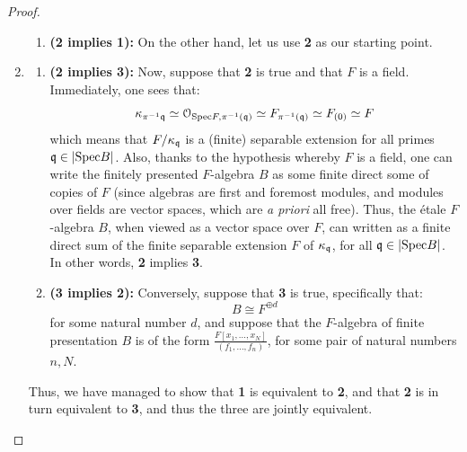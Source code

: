 \begin{proof}
\begin{enumerate}
\begin{enumerate}
                                \item \textbf{(2 implies 1):} On the other hand, let us use \textbf{2} as our starting point. 
                            \end{enumerate}
                        \item 
                            \begin{enumerate}
                                \item \textbf{(2 implies 3):} Now, suppose that \textbf{2} is true and that $F$ is a field. Immediately, one sees that:
                                    $$\kappa_{\pi^{-1}{\mathfrak{q}}} \simeq \mathcal{O}_{\mathrm{Spec} F, \pi^{-1}(\mathfrak{q})} \simeq F_{\pi^{-1}(\mathfrak{q})} \simeq F_{(0)} \simeq F$$ 
                                which means that $F/\kappa_{\mathfrak{q}}$ is a (finite) separable extension for all primes $\mathfrak{q} \in \left|\mathrm{Spec} B\right|$. Also, thanks to the hypothesis whereby $F$ is a field, one can write the finitely presented $F$-algebra $B$ as some finite direct some of copies of $F$ (since algebras are first and foremost modules, and modules over fields are vector spaces, which are \textit{a priori} all free). Thus, the \'etale $F$-algebra $B$, when viewed as a vector space over $F$, can written as a finite direct sum of the finite separable extension $F$ of $\kappa_{\mathfrak{q}}$, for all $\mathfrak{q} \in |\mathrm{Spec} B|$. In other words, \textbf{2} implies \textbf{3}. 
                                \item \textbf{(3 implies 2):} Conversely, suppose that \textbf{3} is true, specifically that:
                                    $$B \cong F^{\oplus d}$$
                                for some natural number $d$, and suppose that the $F$-algebra of finite presentation $B$ is of the form $\frac{F[x_1, ..., x_N]}{(f_1, ..., f_n)}$, for some pair of natural numbers $n, N$. 
                            \end{enumerate}
                        Thus, we have managed to show that \textbf{1} is equivalent to \textbf{2}, and that \textbf{2} is in turn equivalent to \textbf{3}, and thus the three are jointly equivalent. 
                    \end{enumerate}
                \end{proof}
